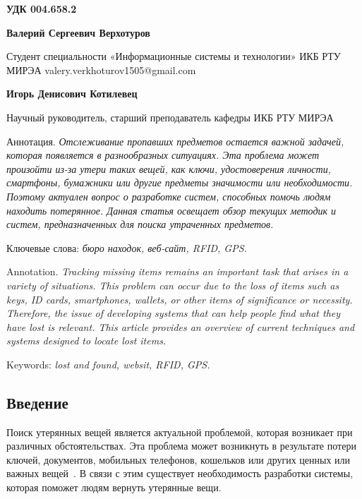 \documentclass{mirea-article}
\begin{document}
	
	\textbf{УДК 004.658.2}
	
	\begin{FlushRight}
		\textbf{Валерий Сергеевич Верхотуров} 
		
		Студент специальности «Информационные системы и технологии» ИКБ РТУ МИРЭА valery.verkhoturov1505@gmail.com

		\textbf{Игорь Денисович Котилевец} 
		
		Научный руководитель, старший преподаватель кафедры ИКБ РТУ МИРЭА
	\end{FlushRight}
	
	
	Аннотация. \textit{Отслеживание пропавших предметов остается важной задачей, которая появляется в разнообразных ситуациях. Эта проблема может произойти из-за утери таких вещей, как ключи, удостоверения личности, смартфоны, бумажники или другие предметы значимости или необходимости. Поэтому актуален вопрос о разработке систем, способных помочь людям находить потерянное. Данная статья освещает обзор текущих методик и систем, предназначенных для поиска утраченных предметов.}
	
	Ключевые слова: \textit{бюро находок, веб-сайт, RFID, GPS.}
	
	
	Annotation. \textit{Tracking missing items remains an important task that arises in a variety of situations. This problem can occur due to the loss of items such as keys, ID cards, smartphones, wallets, or other items of significance or necessity. Therefore, the issue of developing systems that can help people find what they have lost is relevant. This article provides an overview of current techniques and systems designed to locate lost items.}
	
	Keywords: \textit{lost and found, websit, RFID, GPS.}
	
	\subsection*{Введение}
	\label{sec:introduction}
	
	Поиск утерянных вещей является актуальной проблемой, которая возникает при различных обстоятельствах. Эта проблема может возникнуть в результате потери ключей, документов, мобильных телефонов, кошельков или других ценных или важных вещей~\cite{bib:m24_losts_article,bib:usinsk_losts_article}. В связи с этим существует необходимость разработки системы, которая поможет людям вернуть утерянные вещи.
	
\end{document}

